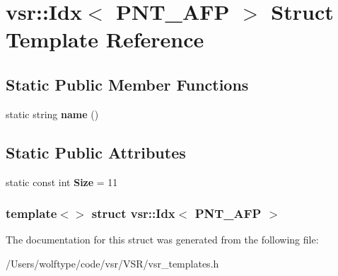 \hypertarget{structvsr_1_1_idx_3_01_p_n_t___a_f_p_01_4}{\section{vsr\-:\-:Idx$<$ P\-N\-T\-\_\-\-A\-F\-P $>$ Struct Template Reference}
\label{structvsr_1_1_idx_3_01_p_n_t___a_f_p_01_4}
}
\subsection*{Static Public Member Functions}
\begin{DoxyCompactItemize}
\item 
\hypertarget{structvsr_1_1_idx_3_01_p_n_t___a_f_p_01_4_a160aa130a2185fa24a6b4dae2f1659cf}{static string {\bfseries name} ()}\label{structvsr_1_1_idx_3_01_p_n_t___a_f_p_01_4_a160aa130a2185fa24a6b4dae2f1659cf}

\end{DoxyCompactItemize}
\subsection*{Static Public Attributes}
\begin{DoxyCompactItemize}
\item 
\hypertarget{structvsr_1_1_idx_3_01_p_n_t___a_f_p_01_4_a630258ade8805edf1d1504ec698698c5}{static const int {\bfseries Size} = 11}\label{structvsr_1_1_idx_3_01_p_n_t___a_f_p_01_4_a630258ade8805edf1d1504ec698698c5}

\end{DoxyCompactItemize}
\subsubsection*{template$<$$>$ struct vsr\-::\-Idx$<$ P\-N\-T\-\_\-\-A\-F\-P $>$}



The documentation for this struct was generated from the following file\-:\begin{DoxyCompactItemize}
\item 
/\-Users/wolftype/code/vsr/\-V\-S\-R/vsr\-\_\-templates.\-h\end{DoxyCompactItemize}
